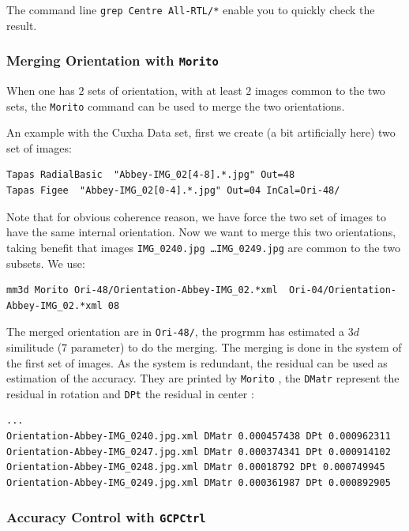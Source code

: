 The command line {\tt grep Centre All-RTL/*} enable you to quickly check the result.


\subsubsection{Merging Orientation with {\tt Morito}}\label{Sec:Morito}

When one has $2$ sets of orientation, with at least $2$ images common to the two sets, the  {\tt Morito} command
can be used to merge the two orientations.

An example with the Cuxha Data set, first we create (a bit artificially here) two set of images:

\begin{verbatim}
Tapas RadialBasic  "Abbey-IMG_02[4-8].*.jpg" Out=48
Tapas Figee  "Abbey-IMG_02[0-4].*.jpg" Out=04 InCal=Ori-48/
\end{verbatim}

Note that for obvious coherence reason, we have force the two set of images to have the same internal orientation.
Now we want to merge this two orientations, taking benefit that images {\tt IMG\_0240.jpg \dots IMG\_0249.jpg} are common to the two subsets. We use:

\begin{verbatim}
mm3d Morito Ori-48/Orientation-Abbey-IMG_02.*xml  Ori-04/Orientation-Abbey-IMG_02.*xml 08
\end{verbatim}

The merged orientation are in {\tt Ori-48/}, the progrmm has estimated a $3d$ similitude ($7$ parameter) to do the merging. The merging is done in the system of the first set of images.  As the system is redundant, the residual can be used as estimation of the accuracy. They are printed by {\tt Morito} , the {\tt DMatr} represent the residual in rotation and {\tt DPt} the residual in center :


\begin{verbatim}
...
Orientation-Abbey-IMG_0240.jpg.xml DMatr 0.000457438 DPt 0.000962311
Orientation-Abbey-IMG_0247.jpg.xml DMatr 0.000374341 DPt 0.000914102
Orientation-Abbey-IMG_0248.jpg.xml DMatr 0.00018792 DPt 0.000749945
Orientation-Abbey-IMG_0249.jpg.xml DMatr 0.000361987 DPt 0.000892905
\end{verbatim}


\subsubsection{Accuracy Control with {\tt GCPCtrl}}\label{Sec:GCPCtrl}

